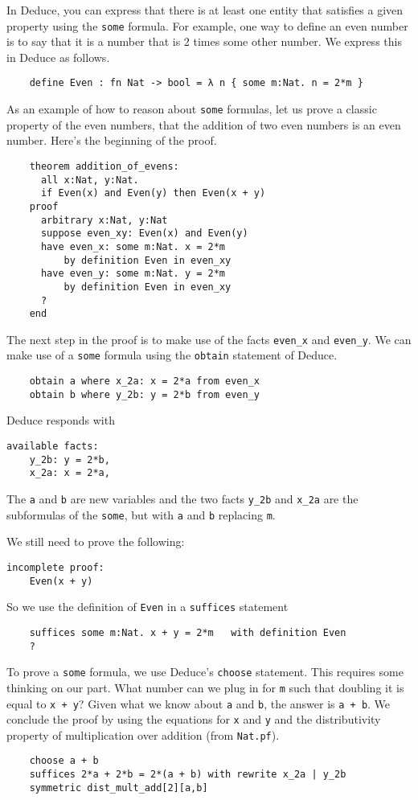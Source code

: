 \documentclass[12pt]{article}
\begin{document}
In Deduce, you can express that there is at least one entity that
satisfies a given property using the \texttt{some} formula.  For example, one
way to define an even number is to say that it is a number that is 2
times some other number. We express this in Deduce as follows.
\begin{verbatim}
    define Even : fn Nat -> bool = λ n { some m:Nat. n = 2*m }
\end{verbatim}
As an example of how to reason about \texttt{some} formulas, let us prove a
classic property of the even numbers, that the addition of two even
numbers is an even number. Here's the beginning of the proof.
\begin{verbatim}
    theorem addition_of_evens:
      all x:Nat, y:Nat.
      if Even(x) and Even(y) then Even(x + y)
    proof
      arbitrary x:Nat, y:Nat
      suppose even_xy: Even(x) and Even(y)
      have even_x: some m:Nat. x = 2*m
          by definition Even in even_xy
      have even_y: some m:Nat. y = 2*m
          by definition Even in even_xy
      ?
    end
\end{verbatim}
The next step in the proof is to make use of the facts
\texttt{even\_x} and \texttt{even\_y}.  We can make use of a
\texttt{some} formula using the \texttt{obtain} statement of Deduce.
\begin{verbatim}
    obtain a where x_2a: x = 2*a from even_x
    obtain b where y_2b: y = 2*b from even_y
\end{verbatim}
Deduce responds with
\begin{verbatim}
available facts:
    y_2b: y = 2*b,
    x_2a: x = 2*a,
\end{verbatim}
The \texttt{a} and \texttt{b} are new variables and the two facts
\texttt{y\_2b} and \texttt{x\_2a} are the subformulas of the
\texttt{some}, but with \texttt{a} and \texttt{b} replacing
\texttt{m}.

We still need to prove the following:
\begin{verbatim}
incomplete proof:
    Even(x + y)
\end{verbatim}
So we use the definition of \texttt{Even} in a \texttt{suffices} statement
\begin{verbatim}
    suffices some m:Nat. x + y = 2*m   with definition Even
    ?
\end{verbatim}
To prove a \texttt{some} formula, we use Deduce's \texttt{choose}
statement.  This requires some thinking on our part.  What number can
we plug in for \texttt{m} such that doubling it is equal to \texttt{x
  + y}? Given what we know about \texttt{a} and \texttt{b}, the answer
is \texttt{a + b}. We conclude the proof by using the equations for
\texttt{x} and \texttt{y} and the distributivity property of
multiplication over addition (from \texttt{Nat.pf}).
\begin{verbatim}
    choose a + b
    suffices 2*a + 2*b = 2*(a + b) with rewrite x_2a | y_2b
    symmetric dist_mult_add[2][a,b]
\end{verbatim}
\end{document}

